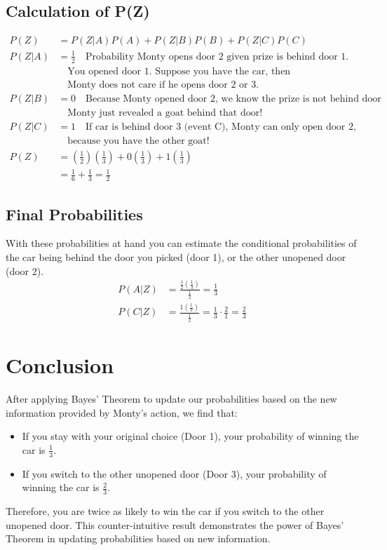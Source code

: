 \documentclass{article}
\begin{document}
\subsection{Calculation of P(Z)}
\begin{align*}
    P(Z) &= P(Z|A)P(A) + P(Z|B)P(B) + P(Z|C)P(C) \\
    P(Z|A) &= \frac{1}{2} \quad \text{Probability Monty opens door 2 given prize is behind door 1.} \\
    &\quad \text{You opened door 1. Suppose you have the car, then} \\
    &\quad \text{Monty does not care if he opens door 2 or 3.} \\
    P(Z|B) &= 0 \quad \text{Because Monty opened door 2, we know the prize is not behind door 2} \\
    &\quad \text{Monty just revealed a goat behind that door!} \\
    P(Z|C) &= 1 \quad \text{If car is behind door 3 (event C), Monty can only open door 2,} \\
    &\quad \text{because you have the other goat!} \\
    P(Z) &= \left(\frac{1}{2}\right)\left(\frac{1}{3}\right) + 0\left(\frac{1}{3}\right) + 1\left(\frac{1}{3}\right) \\
    &= \frac{1}{6} + \frac{1}{3} = \frac{1}{2}
\end{align*}

\subsection{Final Probabilities}

With these probabilities at hand you can estimate the conditional probabilities of the car being behind the door you picked (door 1), or the other unopened door (door 2).
\begin{align*}
    P(A|Z) &= \frac{\frac{1}{2}\left(\frac{1}{3}\right)}{\frac{1}{2}} = \frac{1}{3} \\
    P(C|Z) &= \frac{1\left(\frac{1}{3}\right)}{\frac{1}{2}} = \frac{1}{3} \cdot \frac{2}{1} = \frac{2}{3}
\end{align*}

\section{Conclusion}

After applying Bayes' Theorem to update our probabilities based on the new information provided by Monty's action, we find that:

\begin{itemize}
    \item If you stay with your original choice (Door 1), your probability of winning the car is $\frac{1}{3}$.
    \item If you switch to the other unopened door (Door 3), your probability of winning the car is $\frac{2}{3}$.
\end{itemize}

Therefore, you are twice as likely to win the car if you switch to the other unopened door. This counter-intuitive result demonstrates the power of Bayes' Theorem in updating probabilities based on new information.
\end{document}
